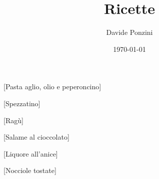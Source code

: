 \documentclass[a4paper, 11pt]{article}
\title{Ricette}
\author{Davide Ponzini}
\date{\today}
\begin{document}
\makeheader

% 

[Pasta aglio, olio e peperoncino]













[Spezzatino]






















[Ragù]







[Salame al cioccolato]









[Liquore all'anice]


[Nocciole tostate]




\end{document}
